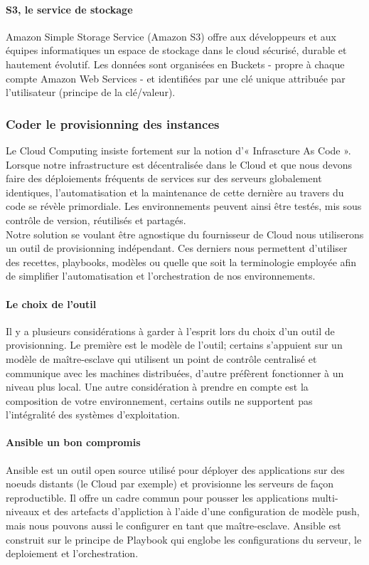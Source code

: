           \paragraph{S3, le service de stockage}
          Amazon Simple Storage Service (Amazon S3) offre aux développeurs et aux équipes informatiques un espace de stockage dans le cloud sécurisé, durable et hautement évolutif. Les données sont organisées en Buckets - propre à chaque compte Amazon Web Services - et identifiées par une clé unique attribuée par l'utilisateur (principe de la clé/valeur).

        \subsubsection{Coder le provisionning des instances}
        Le Cloud Computing insiste fortement sur la notion d'« Infrascture As Code ». Lorsque notre infrastructure est décentralisée dans le Cloud et que nous devons faire des déploiements fréquents de services sur des serveurs globalement identiques, l'automatisation et la maintenance de cette dernière au travers du code se révèle primordiale. Les environnements peuvent ainsi être testés, mis sous contrôle de version, réutilisés et partagés.\\

        Notre solution se voulant être agnostique du fournisseur de Cloud nous utiliserons un outil de provisionning indépendant. Ces derniers nous permettent d'utiliser des recettes, playbooks, modèles ou quelle que soit la terminologie employée afin de simplifier l'automatisation et l'orchestration de nos environnements.

          \paragraph{Le choix de l'outil}
          Il y a plusieurs considérations à garder à l'esprit lors du choix d'un outil de provisionning. Le première est le modèle de l'outil; certains s'appuient sur un modèle de maître-esclave qui utilisent un point de contrôle centralisé et communique avec les machines distribuées, d'autre préfèrent fonctionner à un niveau plus local. Une autre considération à prendre en compte est la composition de votre environnement, certains outils ne supportent pas l'intégralité des systèmes d'exploitation.

          \paragraph{Ansible un bon compromis}\label{Ansible}
          Ansible est un outil open source utilisé pour déployer des applications sur des noeuds distants (le Cloud par exemple) et provisionne les serveurs de façon reproductible. Il offre un cadre commun pour pousser les applications multi-niveaux et des artefacts d'appliction à l'aide d'une configuration de modèle push, mais nous pouvons aussi le configurer en tant que maître-esclave. Ansible est construit sur le principe de Playbook qui englobe les configurations du serveur, le deploiement et l'orchestration.\\

